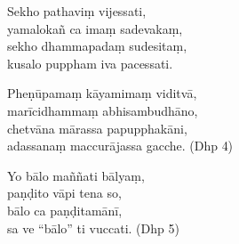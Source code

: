Sekho pathaviṃ vijessati,\\
yamalokañ ca imaṃ sadevakaṃ,\\
sekho dhammapadaṃ sudesitaṃ,\\
kusalo puppham iva pacessati.

Pheṇūpamaṃ kāyamimaṃ viditvā,\\
marīcidhammaṃ abhisambudhāno,\\
chetvāna mārassa papupphakāni,\\
adassanaṃ maccurājassa gacche. (Dhp 4)

Yo bālo maññati bālyaṃ,\\
paṇḍito vāpi tena so,\\
bālo ca paṇḍitamānī,\\
sa ve “bālo” ti vuccati. (Dhp 5)